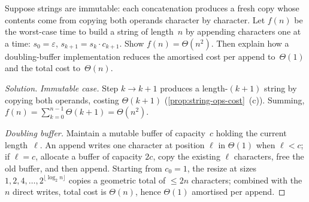 \begin{problem}
\label{prob:concat-cost}
Suppose strings are immutable: each concatenation produces a fresh
copy whose contents come from copying both operands character by
character. Let $f(n)$ be the worst-case time to build a string of
length~$n$ by appending characters one at a time:
$s_0 = \varepsilon$, $s_{k+1} = s_k \cdot c_{k+1}$. Show
$f(n) = \Theta(n^2)$. Then explain how a doubling-buffer
implementation reduces the amortised cost per append to~$\Theta(1)$
and the total cost to~$\Theta(n)$.
\end{problem}

\begin{proof}[Solution]
\emph{Immutable case.} Step $k \to k + 1$ produces a length-$(k+1)$
string by copying both operands, costing $\Theta(k + 1)$
(\cref{prop:string-ops-cost}~(c)). Summing,
$f(n) = \sum_{k=0}^{n-1} \Theta(k + 1) = \Theta(n^2)$.

\emph{Doubling buffer.} Maintain a mutable buffer of capacity~$c$
holding the current length~$\ell$. An append writes one character at
position $\ell$ in $\Theta(1)$ when $\ell < c$; if $\ell = c$,
allocate a buffer of capacity $2c$, copy the existing $\ell$
characters, free the old buffer, and then append. Starting from
$c_0 = 1$, the resize at sizes $1, 2, 4, \dots, 2^{\lfloor \log_2 n \rfloor}$
copies a geometric total of $\le 2 n$ characters; combined with the
$n$ direct writes, total cost is $\Theta(n)$, hence $\Theta(1)$
amortised per append.
\end{proof}
